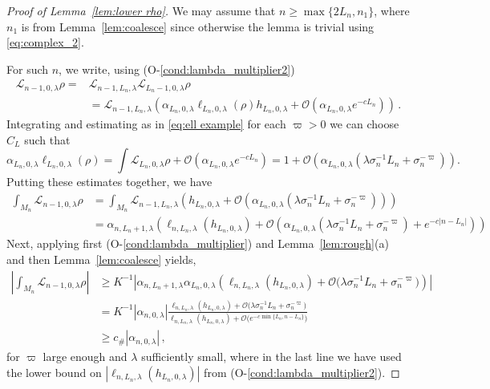 \documentclass{amsart}
\numberwithin{equation}{section}
\newcommand\cL{{\mathcal L}}
\newcommand{\const}{c_{\#}}
\begin{document}
\begin{proof}[Proof of Lemma~\ref{lem:lower rho}]
We may assume that $n \ge \max \{2L_n, n_1 \}$, where $n_1$ is from Lemma~\ref{lem:coalesce} since otherwise the lemma
is trivial using \eqref{eq:complex_2}.

For such $n$, we write, using (O-\ref{cond:lambda_multiplier2})
\[
\begin{split}
\cL_{n-1,0, \lambda} \rho =& \cL_{n-1,L_n,\lambda} \cL_{L_n-1, 0, \lambda} \rho\\
&= \cL_{n-1, L_n,\lambda} \left( \alpha_{L_n,0,\lambda} \ell_{L_n,0,\lambda}(\rho) h_{L_n,0,\lambda}
 +\mathcal{O} (\alpha_{L_n, 0 ,\lambda} e^{-cL_n} ) \right) \, .
\end{split}
\]
Integrating and estimating as in \eqref{eq:ell example} for each $\varpi>0$ we can choose $C_L$ such that
\[
\alpha_{L_n,0,\lambda} \ell_{L_n,0,\lambda}(\rho)
= \int \cL_{L_n, 0, \lambda} \rho + \mathcal{O} (\alpha_{L_n, 0 ,\lambda} e^{-cL_n} )
= 1 + \mathcal{O} (\alpha_{L_n, 0 ,\lambda} (\lambda \sigma_n^{-1} L_n + \sigma_n^{-\varpi})  ) .
\]
Putting these estimates together, we have 
\[
\begin{split}
\int_{M_n} \cL_{n-1,0,\lambda} \rho & = \int_{M_n} \cL_{n-1, L_n, \lambda} \left( h_{L_n,0,\lambda} + \mathcal{O} (\alpha_{L_n, 0 ,\lambda} (\lambda \sigma_n^{-1} L_n + \sigma_n^{-\varpi})  ) \right) \\
& = \alpha_{n ,L_n+1, \lambda} \left( \ell_{n,L_n,\lambda}(h_{L_n,0,\lambda}) + \mathcal{O} (\alpha_{L_n, 0 ,\lambda} (\lambda \sigma_n^{-1} L_n + \sigma_n^{-\varpi}) + e^{-c |n-L_n|} ) \right)
\end{split}
\]
Next, applying first (O-\ref{cond:lambda_multiplier}) and Lemma~\ref{lem:rough}(a) and then Lemma~\ref{lem:coalesce} yields,
\[
\begin{split}
\left| \int_{M_n} \cL_{n-1,0,\lambda} \rho \right| 
& \ge  K^{-1} \left| \alpha_{n ,L_n+1, \lambda} \alpha_{L_n, 0, \lambda} \left( \ell_{n,L_n,\lambda}(h_{L_n,0,\lambda}) + \mathcal{O} \big( \lambda \sigma_n^{-1} L_n + \sigma_n^{-\varpi} \big) \right) \right| \\
& = K^{-1} | \alpha_{n, 0, \lambda} | \frac{  \ell_{n,L_n,\lambda}(h_{L_n,0,\lambda}) + \mathcal{O} \big( \lambda \sigma_n^{-1} L_n + \sigma_n^{-\varpi} \big)} {  \ell_{n,L_n,\lambda}(h_{L_n,0,\lambda}) + \mathcal{O} \big( e^{-c \min \{ L_n, n-L_n \} } \big) } \\
& \ge \const | \alpha_{n, 0, \lambda} | \, ,
\end{split}
\]
for $\varpi$ large enough and $\lambda$ sufficiently small, where in the last line we have used the lower bound on 
$|\ell_{n,L_n,\lambda}(h_{L_n,0,\lambda})|$ from (O-\ref{cond:lambda_multiplier2}).
\end{proof}
\end{document}
